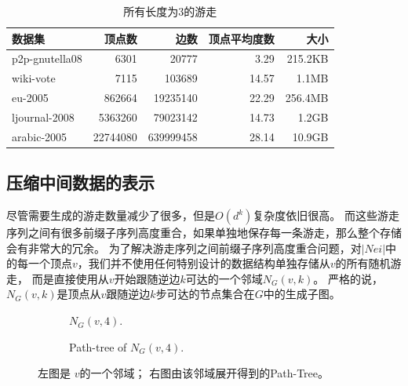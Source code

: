 \documentclass[master]{njuthesis}
\begin{document}
\begin{table}[h]
\caption{所有长度为3的游走}
\label{tab:dataset1}
\centering
\begin{tabular}{|l|r|r|r|r|}
\hline
\textbf{数据集} & \textbf{顶点数} & \textbf{边数} & \textbf{顶点平均度数} & \textbf{大小} \\
\hline
p2p-gnutella08 \footnotemark[1]  & {6301}         & \num{20777}                   & 3.29                & 215.2KB\\
\hline
wiki-vote \footnotemark[2]    & 7115 	& \num{103689}                           &14.57                & 1.1MB  \\
\hline
eu-2005       \footnotemark[3]     & \num{862664}  & \num{19235140 }          & 22.29             & 256.4MB\\
\hline
ljournal-2008  \footnotemark[4] & \num{5363260} & \num{79023142}         & 14.73            &1.2GB\\
\hline
arabic-2005 \footnotemark[5]   & \num{22744080} & \num{639999458}      & 28.14           & 10.9GB\\
\hline
\end{tabular}
\end{table}
\fi
\subsection{压缩中间数据的表示}
尽管需要生成的游走数量减少了很多，但是$O(d^k)$复杂度依旧很高。
而这些游走序列之间有很多前缀子序列高度重合，如果单独地保存每一条游走，那么整个存储会有非常大的冗余。
为了解决游走序列之间前缀子序列高度重合问题，对$|Nei|$中的每一个顶点$v$，我们并不使用任何特别设计的数据结构单独存储从$v$的所有随机游走，
而是直接使用从$v$开始跟随逆边$k$可达的一个邻域$N_{G}(v, k)$。
严格的说，$N_{G}(v, k)$是顶点从$v$跟随逆边$k$步可达的节点集合在$G$中的生成子图。
\begin{figure}[h]
    \centering
    \begin{subfigure}[b]{0.48\linewidth}        %
        \centering
        \label{fig:match_walks_one}
	\resizebox{!}{!}{}
	\caption{$N_G(v, 4)$.}
	
	\end{subfigure}
    \begin{subfigure}[b]{0.48\linewidth}        %
     \centering
	\resizebox{!}{!}{}
	\caption{Path-tree of $N_G(v, 4)$.}
	\label{fig:match_walks_two}
    \end{subfigure}
    \caption{左图是 $v $的一个邻域； 右图由该邻域展开得到的Path-Tree。}
    \label{fig:match_walks}
\end{figure}
\end{document}
